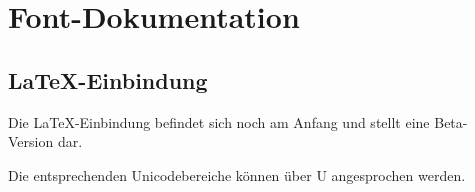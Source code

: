 %
%
%
%
\chapter{Font-Dokumentation}





\section{\LaTeX-Einbindung}

Die \LaTeX-Einbindung befindet sich noch am Anfang und stellt eine Beta-Version dar.

Die entsprechenden Unicodebereiche können über U angesprochen werden.


\endinput
